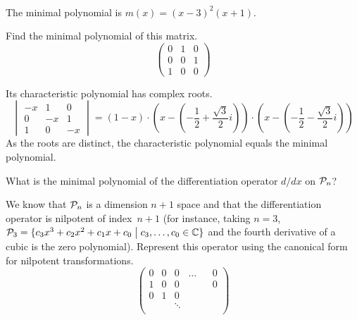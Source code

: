 \begin{exercises}
\begin{answer}
\begin{exparts}
\begin{multline*}
         \end{multline*}
         The minimal polynomial is \( m(x)=(x-3)^2(x+1) \).
      \end{exparts} 
    \end{answer}
   \item 
     Find the minimal polynomial of this matrix.
     \begin{equation*}
        \begin{pmatrix}
           0  &1  &0  \\
           0  &0  &1  \\
           1  &0  &0
        \end{pmatrix}
     \end{equation*}
     \begin{answer}
       Its characteristic polynomial has complex roots.
       \begin{equation*}
          \begin{vmatrix}
                   -x  &1  &0  \\
                    0  &-x &1  \\
                    1  &0  &-x
          \end{vmatrix}
          =(1-x)\cdot (x-(-\frac{1}{2}+\frac{\sqrt{3}}{2}i))
                \cdot (x-(-\frac{1}{2}-\frac{\sqrt{3}}{2}i))
       \end{equation*}
       As the roots are distinct, the characteristic polynomial equals the
       minimal polynomial. 
     \end{answer}
  \recommended \item 
     What is the minimal polynomial of the differentiation
     operator $d/dx$ on \( \mathcal{P}_n \)?
     \begin{answer}
       We know that $\mathcal{P}_n$ is a dimension $n+1$ space and that
       the differentiation operator is
       nilpotent of index~$n+1$ (for instance, taking $n=3$, 
       $\mathcal{P}_3=\mbox{$\{c_3x^3+c_2x^2+c_1x+c_0\bigm| c_3,\ldots,c_0\in\mathbb{C}\}$}$
       and the fourth derivative of a cubic is the zero polynomial).  
       Represent this operator using the canonical 
       form for nilpotent transformations.
       \begin{equation*}
         \begin{pmatrix}
           0  &0  &0  &\ldots &  &0  \\
           1  &0  &0  &       &  &0  \\
           0  &1  &0  &       &  &   \\
              &   &\ddots            \\

\end{pmatrix}
\end{equation*}
\end{answer}
\end{exercises}
